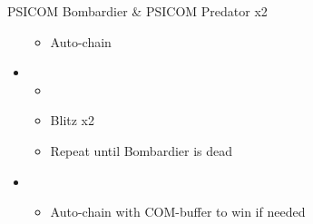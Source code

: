 \begin{multicols}{2}
\begin{battle}[0:26]{PSICOM Bombardier \& PSICOM Predator x2}
\begin{itemize}
\begin{itemize}
              \item Auto-chain
            \end{itemize}
      \item \first
            \begin{itemize}
              \item \stagger
              \item Blitz x2
              \item Repeat until Bombardier is dead
            \end{itemize}
      \item \second
            \begin{itemize}
              \item Auto-chain with COM-buffer to win if needed
            \end{itemize}
    \end{itemize}
     
  \end{battle}

  \vfill


\end{multicols}
